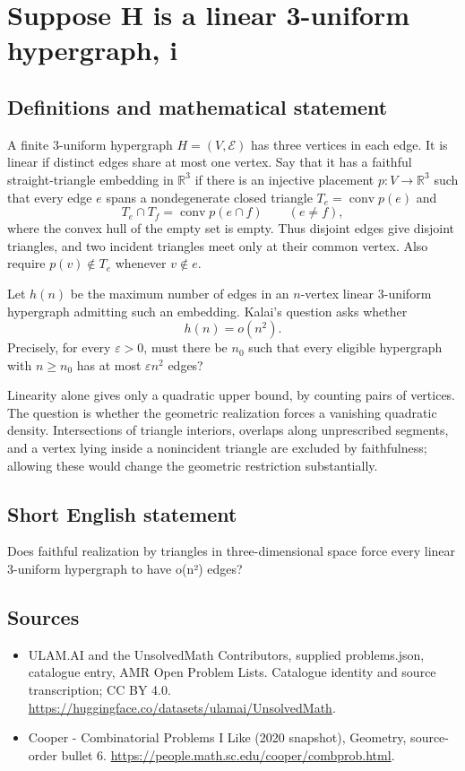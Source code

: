 \documentclass[11pt,a4paper]{article}
\begin{document}
\section*{Suppose H is a linear 3-uniform hypergraph, i}\label{statement}

\subsection{Definitions and mathematical statement}
A finite $3$-uniform hypergraph $H=(V,\mathcal E)$ has three vertices
in each edge. It is linear if distinct edges share at most one
vertex. Say that it has a faithful straight-triangle embedding in
$\mathbb R^3$ if there is an injective placement $p:V\to\mathbb R^3$
such that every edge $e$ spans a nondegenerate closed triangle
$T_e=\operatorname{conv}p(e)$ and
\[
 T_e\cap T_f=\operatorname{conv}p(e\cap f)
                  \qquad(e\ne f),
\]
where the convex hull of the empty set is empty. Thus disjoint edges
give disjoint triangles, and two incident triangles meet only at
their common vertex. Also require $p(v)\notin T_e$ whenever $v\notin e$.

Let $h(n)$ be the maximum number of edges in an $n$-vertex linear
$3$-uniform hypergraph admitting such an embedding. Kalai's question
asks whether
\[
                           h(n)=o(n^2).
\]
Precisely, for every $\varepsilon>0$, must there be $n_0$ such that
every eligible hypergraph with $n\ge n_0$ has at most
$\varepsilon n^2$ edges?

Linearity alone gives only a quadratic upper bound, by counting
pairs of vertices. The question is whether the geometric realization
forces a vanishing quadratic density. Intersections of triangle
interiors, overlaps along unprescribed segments, and a vertex lying
inside a nonincident triangle are excluded by faithfulness; allowing
these would change the geometric restriction substantially.
\subsection{Short English statement}
Does faithful realization by triangles in three-dimensional space force every linear 3-uniform hypergraph to have o(n²) edges?
\subsection{Sources}
\begin{itemize}
\item[S1] ULAM.AI and the UnsolvedMath Contributors, supplied problems.json, catalogue entry, AMR Open Problem Lists. Catalogue identity and source transcription; CC BY 4.0.
\url{https://huggingface.co/datasets/ulamai/UnsolvedMath}.
\item[S2] Cooper - Combinatorial Problems I Like (2020 snapshot), Geometry, source-order bullet 6. 
\url{https://people.math.sc.edu/cooper/combprob.html}.
\end{itemize}
\end{document}
